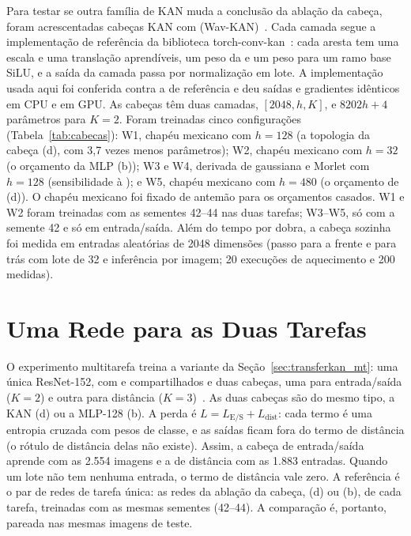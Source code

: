 Para testar se outra família de KAN muda a conclusão da ablação da cabeça, foram acrescentadas cabeças KAN com  (Wav-KAN)~\cite{bozorgasl2024wavkan}. Cada camada segue a implementação de referência da biblioteca torch-conv-kan~\cite{drokin2024torchconvkan}: cada aresta tem uma escala e uma translação aprendíveis, um peso da  e um peso para um ramo base SiLU, e a saída da camada passa por normalização em lote. A implementação usada aqui foi conferida contra a de referência e deu saídas e gradientes idênticos em CPU e em GPU. As cabeças têm duas camadas, $[2048, h, K]$, e $8202h + 4$ parâmetros para $K=2$. Foram treinadas cinco configurações (Tabela~\ref{tab:cabecas}): W1, chapéu mexicano com $h=128$ (a topologia da cabeça (d), com 3,7 vezes menos parâmetros); W2, chapéu mexicano com $h=32$ (o orçamento da MLP (b)); W3 e W4,  derivada de gaussiana e Morlet com $h=128$ (sensibilidade à ); e W5, chapéu mexicano com $h=480$ (o orçamento de (d)). O chapéu mexicano foi fixado de antemão para os orçamentos casados. W1 e W2 foram treinadas com as sementes 42--44 nas duas tarefas; W3--W5, só com a semente 42 e só em entrada/saída. Além do tempo por dobra, a cabeça sozinha foi medida em entradas aleatórias de 2048 dimensões (passo para a frente e para trás com lote de 32 e inferência por imagem; 20 execuções de aquecimento e 200 medidas).

\section{Uma Rede para as Duas Tarefas}
\label{sec:mt_setup}

O experimento multitarefa treina a variante da Seção~\ref{sec:transferkan_mt}: uma única ResNet-152, com  e  compartilhados e duas cabeças, uma para entrada/saída ($K=2$) e outra para distância ($K=3$)~\cite{caruana1997multitask,ruder2017overview}. As duas cabeças são do mesmo tipo, a KAN (d) ou a MLP-128 (b). A perda é $L = L_{\mathrm{E/S}} + L_{\mathrm{dist}}$: cada termo é uma entropia cruzada com pesos de classe, e as saídas ficam fora do termo de distância (o rótulo de distância delas não existe). Assim, a cabeça de entrada/saída aprende com as 2.554 imagens e a de distância com as 1.883 entradas. Quando um lote não tem nenhuma entrada, o termo de distância vale zero. A referência é o par de redes de tarefa única: as redes da ablação da cabeça, (d) ou (b), de cada tarefa, treinadas com as mesmas sementes (42--44). A comparação é, portanto, pareada nas mesmas imagens de teste.

